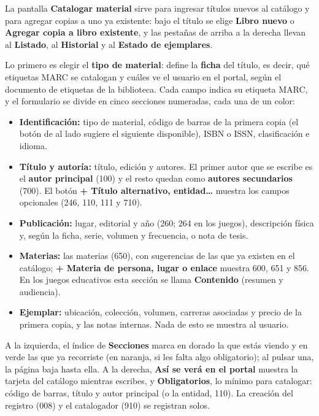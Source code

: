 \documentclass[11pt,a4paper]{report}
\begin{document}
La pantalla \textbf{Catalogar material} sirve para ingresar títulos
nuevos al catálogo y para agregar copias a uno ya existente: bajo el
título se elige \textbf{Libro nuevo} o \textbf{Agregar copia a libro
existente}, y las pestañas de arriba a la derecha llevan al
\textbf{Listado}, al \textbf{Historial} y al \textbf{Estado de
ejemplares}.

Lo primero es elegir el \textbf{tipo de material}: define la
\textbf{ficha} del título, es decir, qué etiquetas MARC se catalogan y
cuáles ve el usuario en el portal, según el documento de etiquetas de la
biblioteca. Cada campo indica su etiqueta MARC, y el formulario se divide
en cinco secciones numeradas, cada una de un color:

\begin{itemize}
  \item \textbf{Identificación:} tipo de material, código de barras de la
  primera copia (el botón de al lado sugiere el siguiente disponible), ISBN
  o ISSN, clasificación e idioma.
  \item \textbf{Título y autoría:} título, edición y autores. El primer
  autor que se escribe es el \textbf{autor principal} (100) y el resto
  quedan como \textbf{autores secundarios} (700). El botón
  \textbf{+ Título alternativo, entidad\ldots} muestra los campos
  opcionales (246, 110, 111 y 710).
  \item \textbf{Publicación:} lugar, editorial y año (260; 264 en los
  juegos), descripción física y, según la ficha, serie, volumen y
  frecuencia, o nota de tesis.
  \item \textbf{Materias:} las materias (650), con sugerencias de las que
  ya existen en el catálogo; \textbf{+ Materia de persona, lugar o enlace}
  muestra 600, 651 y 856. En los juegos educativos esta sección se llama
  \textbf{Contenido} (resumen y audiencia).
  \item \textbf{Ejemplar:} ubicación, colección, volumen, carreras
  asociadas y precio de la primera copia, y las notas internas. Nada de
  esto se muestra al usuario.
\end{itemize}

A la izquierda, el índice de \textbf{Secciones} marca en dorado la que
estás viendo y en verde las que ya recorriste (en naranja, si les falta
algo obligatorio); al pulsar una, la página baja hasta ella. A la derecha,
\textbf{Así se verá en el portal} muestra la tarjeta del catálogo mientras
escribes, y \textbf{Obligatorios}, lo mínimo para catalogar: código de
barras, título y autor principal (o la entidad, 110). La creación del
registro (008) y el catalogador (910) se registran solos.
\end{document}
